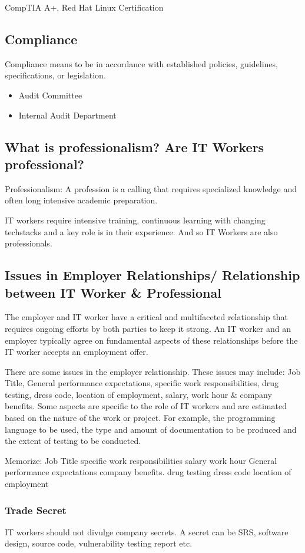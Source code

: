 \documentclass[11pt]{article}
\begin{document}
CompTIA A+, Red Hat Linux Certification
\subsection{Compliance}
\label{sec:orgaaaf485}
Compliance means to be in accordance with established policies, guidelines, specifications, or legislation.

\begin{itemize}
\item Audit Committee
\item Internal Audit Department
\end{itemize}
\subsection{What is professionalism? Are IT Workers professional?}
\label{sec:org1d5e507}
Professionalism: A profession is a calling that requires specialized knowledge and often long intensive academic preparation.

IT workers require intensive training, continuous learning with changing techstacks and a key role is in their experience. And so IT Workers are also professionals.
\subsection{Issues in Employer Relationships/ Relationship between IT Worker \& Professional}
\label{sec:orgb061ef9}
The employer and IT worker have a critical and multifaceted relationship that requires ongoing efforts by both parties to keep it strong. An IT worker and an employer typically agree on fundamental aspects of these relationships before the IT worker accepts an employment offer.

There are some issues in the employer relationship. These issues may include: Job Title, General performance expectations, specific work responsibilities, drug testing, dress code, location of employment, salary, work hour \& company benefits. Some aspects are specific to the role of IT workers and are estimated based on the nature of the work or project. For example, the programming language to be used, the type and amount of documentation to be produced and the extent of testing to be conducted.

Memorize:
Job Title
specific work responsibilities
salary
work hour
General performance expectations
company benefits.
drug testing
dress code
location of employment
\subsubsection{Trade Secret}
\label{sec:org1b25bc9}
IT workers should not divulge company secrets. A secret can be SRS, software design, source code, vulnerability testing report etc. 
\end{document}
